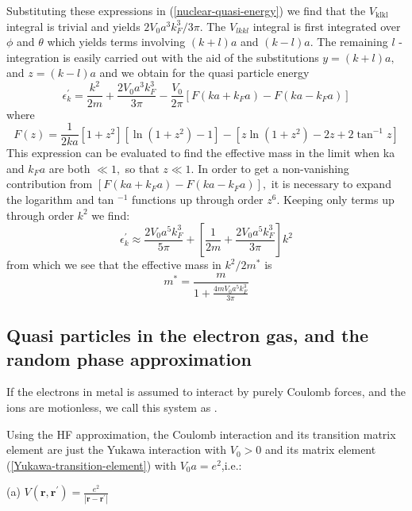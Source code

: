 Substituting these expressions in (\ref{nuclear-quasi-energy}) we find that the $V_{\text {klkl }}$ integral is trivial and yields $2 V_{0} a^{3} k_{F}^{3} / 3 \pi .$ The $V_{lkkl}$ integral is first integrated over $\phi$ and $\theta$ which yields terms involving $(k+l) a$ and $(k-l)a$. The remaining $l$ -integration is easily carried out with the aid of the substitutions $y=(k+l) a,$ and $z=(k-l) a$ and we obtain for the quasi particle energy
\begin{equation}\epsilon_{k}^{\prime}=\frac{k^{2}}{2 m}+\frac{2 V_{0} a^{3} k_{F}^{3}}{3 \pi}-\frac{V_{0}}{2 \pi}\left[F\left(k a+k_{F} a\right)-F\left(k a-k_{F} a\right)\right]\end{equation}
where
\begin{equation}F(z)=\frac{1}{2 k a}\left[1+z^{2}\right]\left[\ln \left(1+z^{2}\right)-1\right]-\left[z \ln \left(1+z^{2}\right)-2 z+2 \tan ^{-1} z\right]\end{equation}
This expression can be evaluated to find the effective mass in the limit when ka and $k_{F} a$ are both $\ll 1,$ so that $z \ll 1 .$ In order to get a non-vanishing contribution from $\left[F\left(k a+k_{F} a\right)-F\left(k a-k_{F} a\right)\right],$ it is necessary to expand the logarithm and tan $^{-1}$ functions up through order $z^{6}$. Keeping only terms up through order $k^{2}$ we find:
\begin{equation}\epsilon_{k}^{\prime} \approx \frac{2 V_{0} a^{5} k_{F}^{3}}{5 \pi}+\left[\frac{1}{2 m}+\frac{2 V_{0} a^{5} k_{F}^{3}}{3 \pi}\right] k^{2}\end{equation}
from which we see that the effective mass in $k^2/2m^*$ is
\begin{equation}m^{*}=\frac{m}{1+\frac{4 m V_{0} a^{5} k_{F}^{3}}{3 \pi}}\end{equation}

\subsection{Quasi particles in the electron gas, and the random phase approximation}
If the electrons in metal is assumed to interact by purely Coulomb forces, and the ions are motionless, we call this system as .

Using the HF approximation, the Coulomb interaction and its transition matrix element are just the Yukawa interaction with $V_0>0$ and its matrix element (\ref{Yukawa-transition-element}) with $V_0a=e^2$,i.e.:

(a) $V\left(\mathbf{r}, \mathbf{r}^{\prime}\right)=\frac{e^{2}}{\left|\mathbf{r}-\mathbf{r}^{\prime}\right|}$

